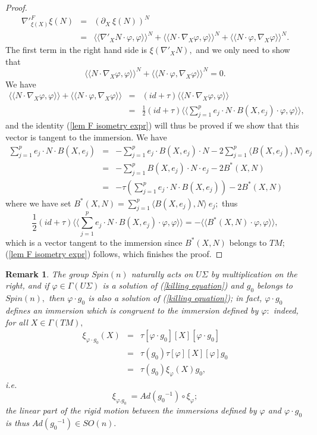 \documentclass{amsart}
\newtheorem{rem}{Remark}
\begin{document}
\begin{proof}
\begin{eqnarray*}
\nabla'^F_{\xi(X)}\xi(N)&=&(\partial_X\ \xi(N))^N\\
&=&\langle\langle\nabla'_XN\cdot\varphi,\varphi\rangle\rangle^N+\langle\langle N\cdot\nabla_X\varphi,\varphi\rangle\rangle^N+\langle\langle N\cdot\varphi,\nabla_X\varphi\rangle\rangle^N.
\end{eqnarray*}
The first term in the right hand side is $\xi(\nabla'_XN),$ and we only need to show that
\begin{equation}\label{lem F isometry expr}
\langle\langle N\cdot\nabla_X\varphi,\varphi\rangle\rangle^N+\langle\langle N\cdot\varphi,\nabla_X\varphi\rangle\rangle^N=0.
\end{equation}
We have
\begin{eqnarray*}
\langle\langle N\cdot\nabla_X\varphi,\varphi\rangle\rangle+\langle\langle N\cdot\varphi,\nabla_X\varphi\rangle\rangle&=&(id+\tau)\langle\langle N\cdot\nabla_X\varphi,\varphi\rangle\rangle\\
&=&\frac{1}{2}(id+\tau)\langle\langle \sum_{j=1}^p e_j\cdot N\cdot B(X,e_j)\cdot\varphi,\varphi\rangle\rangle,
\end{eqnarray*}
and the identity (\ref{lem F isometry expr}) will thus be proved if we show that this vector is tangent to the immersion. We have 
\begin{eqnarray*}
\sum_{j=1}^p e_j\cdot N\cdot B(X,e_j)&=&-\sum_{j=1}^p e_j\cdot B(X,e_j)\cdot N-2\sum_{j=1}^p \langle B(X,e_j), N\rangle \ e_j\\
&=&-\sum_{j=1}^p B(X,e_j)\cdot N\cdot e_j-2B^*(X,N)\\
&=&-\tau \left(\sum_{j=1}^p e_j\cdot N\cdot B(X,e_j)\right)-2B^*(X,N)
\end{eqnarray*}
where we have set $B^*(X,N)=\sum_{j=1}^p \langle B(X,e_j), N\rangle \ e_j;$ thus
$$\frac{1}{2}(id+\tau)\langle\langle \sum_{j=1}^p e_j\cdot N\cdot B(X,e_j)\cdot\varphi,\varphi\rangle\rangle=-\langle\langle B^*(X,N)\cdot\varphi,\varphi\rangle\rangle,$$
which is a vector tangent to the immersion since $B^*(X,N)$ belongs to $TM;$ (\ref{lem F isometry expr}) follows, which finishes the proof. \end{proof}
\begin{rem}\label{rmk congruence}
The group $Spin(n)$ naturally acts on $U\Sigma$ by multiplication on the right, and if $\varphi\in\Gamma(U\Sigma)$ is a solution of (\ref{killing equation}) and $g_0$ belongs to $Spin(n),$ then $\varphi\cdot g_0$ is also a solution of (\ref{killing equation}); in fact, $\varphi\cdot g_0$ defines an immersion which is congruent to the immersion defined by $\varphi:$ indeed, for all $X\in\Gamma(TM),$
\begin{eqnarray*}
\xi_{\varphi\cdot g_0}(X)&=&\tau[\varphi\cdot g_0][X][\varphi\cdot g_0]\\
&=&\tau(g_0)\tau[\varphi][X][\varphi]g_0\\
&=&\tau(g_0)\xi_{\varphi}(X)g_0,
\end{eqnarray*}
i.e.
$$\xi_{\varphi.g_0}\ =Ad({g_0}^{-1})\circ\xi_{\varphi};$$
the linear part of the rigid motion between the immersions defined by $\varphi$ and $\varphi\cdot g_0$ is thus $Ad({g_0}^{-1})\in SO(n).$
\end{rem}
\end{document}

